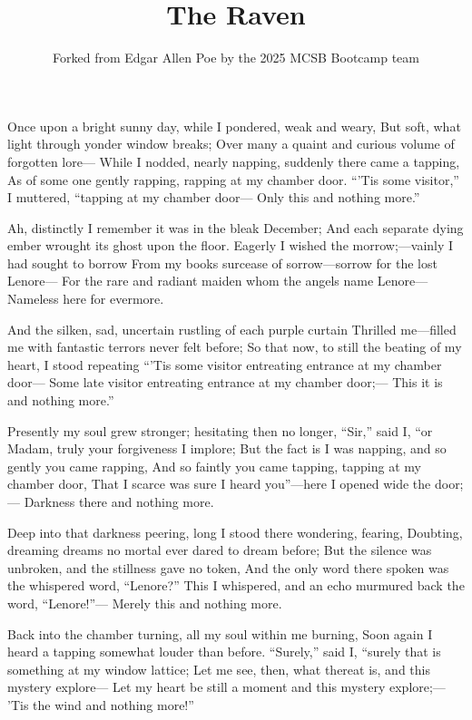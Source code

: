 \documentclass{article}
\title{The Raven}
\author{Forked from Edgar Allen Poe by the 2025 MCSB Bootcamp team}
\begin{document}
\maketitle 

Once upon a bright sunny day, while I pondered, weak and weary,
But soft, what light through yonder window breaks;
Over many a quaint and curious volume of forgotten lore—
    While I nodded, nearly napping, suddenly there came a tapping,
As of some one gently rapping, rapping at my chamber door.
``'Tis some visitor,” I muttered, “tapping at my chamber door—
            Only this and nothing more.”

    Ah, distinctly I remember it was in the bleak December;
And each separate dying ember wrought its ghost upon the floor.
    Eagerly I wished the morrow;—vainly I had sought to borrow
    From my books surcease of sorrow—sorrow for the lost Lenore—
For the rare and radiant maiden whom the angels name Lenore—
            Nameless here for evermore.

    And the silken, sad, uncertain rustling of each purple curtain
Thrilled me—filled me with fantastic terrors never felt before;
    So that now, to still the beating of my heart, I stood repeating
    ``'Tis some visitor entreating entrance at my chamber door—
Some late visitor entreating entrance at my chamber door;—
            This it is and nothing more.”

    Presently my soul grew stronger; hesitating then no longer,
    ``Sir,” said I, ``or Madam, truly your forgiveness I implore;
    But the fact is I was napping, and so gently you came rapping,
    And so faintly you came tapping, tapping at my chamber door,
That I scarce was sure I heard you”—here I opened wide the door;—
            Darkness there and nothing more.

    Deep into that darkness peering, long I stood there wondering, fearing,
Doubting, dreaming dreams no mortal ever dared to dream before;
    But the silence was unbroken, and the stillness gave no token,
    And the only word there spoken was the whispered word, “Lenore?”
This I whispered, and an echo murmured back the word, ``Lenore!”—
            Merely this and nothing more.

    Back into the chamber turning, all my soul within me burning,
Soon again I heard a tapping somewhat louder than before.
``Surely,” said I, “surely that is something at my window lattice;
      Let me see, then, what thereat is, and this mystery explore—
Let my heart be still a moment and this mystery explore;—
'Tis the wind and nothing more!”
\end{document}
